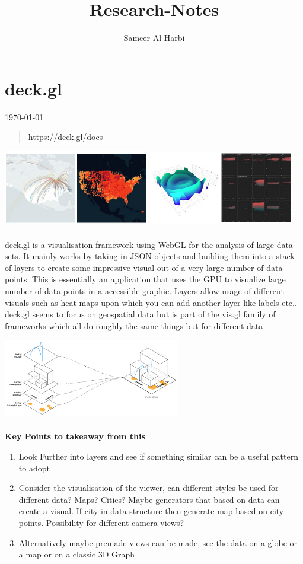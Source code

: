 \documentclass{paper}
\title{Research-Notes}
\author{Sameer Al Harbi}
\begin{document}
\part{deck.gl}
\today
\begin{quote}
\url{https://deck.gl/docs}
\end{quote}
\includegraphics[width=180pt]{map2.PNG}
\includegraphics[width=180pt]{view.PNG}
\\
\\
deck.gl is a visualisation framework using WebGL for the analysis of large data sets. It mainly works by taking in JSON objects and building them into a stack of layers to create some impressive visual out of a very large number of data points. This is essentially an application that uses the GPU to visualize large number of data points in a accessible graphic. Layers allow usage of different visuals such as heat maps upon which you can add another layer like labels etc.. deck.gl seems to focus on geospatial data but is part of the vis.gl family of frameworks which all do roughly the same things but for different data

\includegraphics[width=220pt]{0 faYL1UbVD4af5qzy.png}
\\
\\
\textbf{Key Points to takeaway from this}
\begin{enumerate}
    \item Look Further into layers and see if something similar can be a useful pattern to adopt
    \item Consider the visualisation of the viewer, can different styles be used for different data? Maps? Cities? Maybe generators that based on data can create a visual. If city in data structure then generate map based on city points. Possibility for different camera views?
    \item Alternatively maybe premade views can be made, see the data on a globe or a map or on a classic 3D Graph
\end{enumerate}
\end{document}
